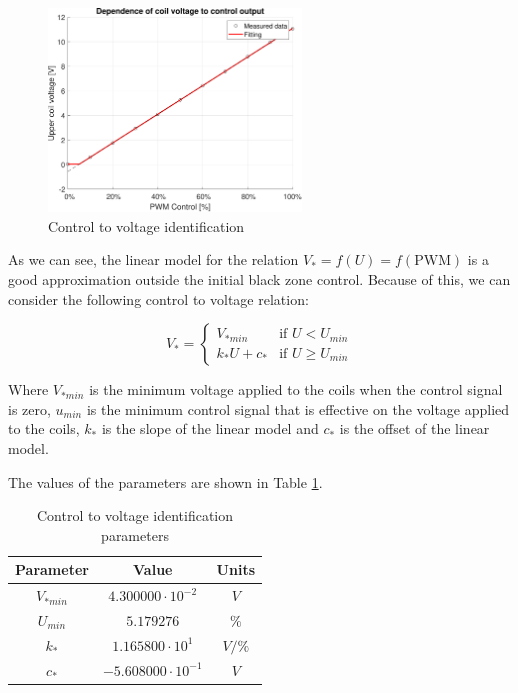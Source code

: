 \begin{figure}[H]
    \centering
    \includegraphics[width=0.6\textwidth]{img/MATLAB/measurements/control_to_voltage.pdf}
    \caption{Control to voltage identification}
    \label{fig:control_to_voltage}
\end{figure}

As we can see, the linear model for the relation $V_* = f(U) = f(\text{PWM})$ is a good approximation outside the initial black zone control.
Because of this, we can consider the following control to voltage relation:

\begin{equation}
    V_* = \begin{cases}
        V_{*min}    & \text{if } U < U_{min}    \\
        k_* U + c_* & \text{if } U \geq U_{min}
    \end{cases}
\end{equation}

Where $V_{*min}$ is the minimum voltage applied to the coils when the control signal is zero, $u_{min}$ is the minimum control signal that is effective on the voltage applied to the coils, $k_*$ is the slope of the linear model and $c_*$ is the offset of the linear model.

The values of the parameters are shown in Table \ref{tab:control_to_voltage_parameters}.

\begin{table}[H]

    \centering
    \begin{tabular}{|c|c|c|}
        \hline
        \textbf{Parameter} & \textbf{Value}            & \textbf{Units} \\
        \hline
        $V_{*min}$         & $4.300000 \cdot 10^{-2}$  & $V$            \\
        $U_{min}$          & $5.179276$                & $\%$           \\
        $k_*$              & $1.165800 \cdot 10^{1}$   & $V/\%$         \\
        $c_*$              & $-5.608000 \cdot 10^{-1}$ & $V$            \\
        \hline
    \end{tabular}

    \caption{Control to voltage identification parameters}
    \label{tab:control_to_voltage_parameters}

\end{table}


